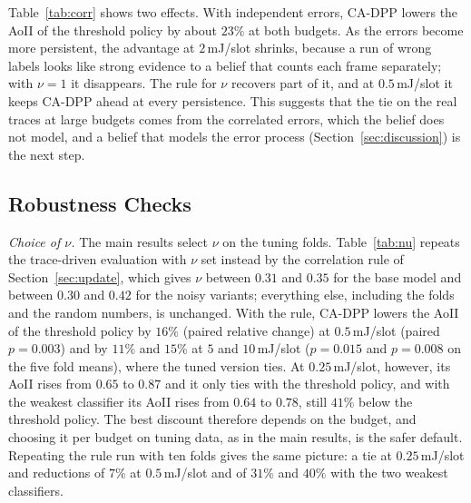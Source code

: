 \documentclass[5p,twocolumn]{elsarticle}
\theoremstyle{remark}
\begin{document}
Table~\ref{tab:corr} shows two effects. With independent errors, CA-DPP lowers the AoII of the threshold policy by about $23\%$ at both budgets. As the errors become more persistent, the advantage at $2$\,mJ/slot shrinks, because a run of wrong labels looks like strong evidence to a belief that counts each frame separately; with $\nu=1$ it disappears. The rule for $\nu$ recovers part of it, and at $0.5$\,mJ/slot it keeps CA-DPP ahead at every persistence. This suggests that the tie on the real traces at large budgets comes from the correlated errors, which the belief does not model, and a belief that models the error process (Section~\ref{sec:discussion}) is the next step.

\subsection{Robustness Checks}\label{res:robust}
\emph{Choice of $\nu$.} The main results select $\nu$ on the tuning folds. Table~\ref{tab:nu} repeats the trace-driven evaluation with $\nu$ set instead by the correlation rule of Section~\ref{sec:update}, which gives $\nu$ between $0.31$ and $0.35$ for the base model and between $0.30$ and $0.42$ for the noisy variants; everything else, including the folds and the random numbers, is unchanged. With the rule, CA-DPP lowers the AoII of the threshold policy by $16\%$ (paired relative change) at $0.5$\,mJ/slot (paired $p=0.003$) and by $11\%$ and $15\%$ at $5$ and $10$\,mJ/slot ($p=0.015$ and $p=0.008$ on the five fold means), where the tuned version ties. At $0.25$\,mJ/slot, however, its AoII rises from $0.65$ to $0.87$ and it only ties with the threshold policy, and with the weakest classifier its AoII rises from $0.64$ to $0.78$, still $41\%$ below the threshold policy. The best discount therefore depends on the budget, and choosing it per budget on tuning data, as in the main results, is the safer default. Repeating the rule run with ten folds gives the same picture: a tie at $0.25$\,mJ/slot and reductions of $7\%$ at $0.5$\,mJ/slot and of $31\%$ and $40\%$ with the two weakest classifiers.
\end{document}
